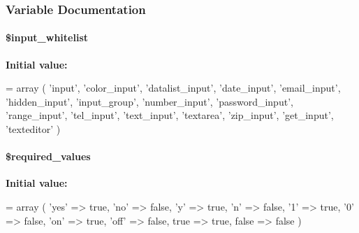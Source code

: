 \subsubsection{Variable Documentation}
\hypertarget{api_8php_a8f899b4769ac4dac9b39bf08a09320bb}{
\paragraph[{\$input\-\_\-whitelist}]{\setlength{\rightskip}{0pt plus 5cm}\$input\-\_\-whitelist}}\label{api_8php_a8f899b4769ac4dac9b39bf08a09320bb}
{\bfseries Initial value\-:}
\begin{DoxyCode}
= array
  (
    \textcolor{stringliteral}{'input'},
    \textcolor{stringliteral}{'color\_input'},
    \textcolor{stringliteral}{'datalist\_input'},
    \textcolor{stringliteral}{'date\_input'},
    \textcolor{stringliteral}{'email\_input'},
    \textcolor{stringliteral}{'hidden\_input'},
    \textcolor{stringliteral}{'input\_group'},
    \textcolor{stringliteral}{'number\_input'},
    \textcolor{stringliteral}{'password\_input'},
    \textcolor{stringliteral}{'range\_input'},
    \textcolor{stringliteral}{'tel\_input'},
    \textcolor{stringliteral}{'text\_input'},
    \textcolor{stringliteral}{'textarea'},
    \textcolor{stringliteral}{'zip\_input'},
    \textcolor{stringliteral}{'get\_input'},
    \textcolor{stringliteral}{'texteditor'}
  )
\end{DoxyCode}
\hypertarget{api_8php_af377fd4ccbb6ba49860aaed32716e805}{
\paragraph[{\$required\-\_\-values}]{\setlength{\rightskip}{0pt plus 5cm}\$required\-\_\-values}}\label{api_8php_af377fd4ccbb6ba49860aaed32716e805}
{\bfseries Initial value\-:}
\begin{DoxyCode}
= array
  (
    \textcolor{stringliteral}{'yes'} => \textcolor{keyword}{true},
    \textcolor{stringliteral}{'no'} => \textcolor{keyword}{false},
    \textcolor{charliteral}{'y'} => \textcolor{keyword}{true},
    \textcolor{charliteral}{'n'} => \textcolor{keyword}{false},
    \textcolor{charliteral}{'1'} => \textcolor{keyword}{true},
    \textcolor{charliteral}{'0'} => \textcolor{keyword}{false},
    \textcolor{stringliteral}{'on'} => \textcolor{keyword}{true},
    \textcolor{stringliteral}{'off'} => \textcolor{keyword}{false},
    \textcolor{keyword}{true} => \textcolor{keyword}{true},
    \textcolor{keyword}{false} => \textcolor{keyword}{false}
  )
\end{DoxyCode}
